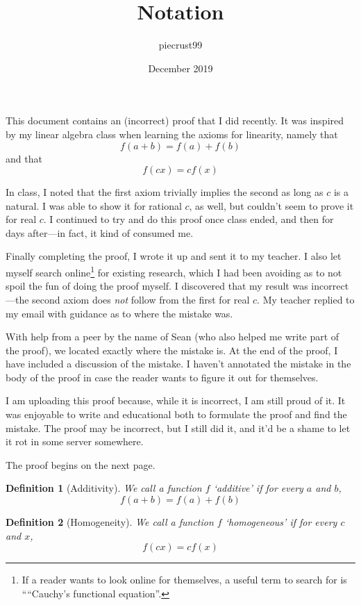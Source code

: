 \documentclass{article}
\title{Notation}
\author{piecrust99 }
\date{December 2019}
\theoremstyle{mytheoremstyle}
\newtheorem{definition}{Definition}
\begin{document}
This document contains an (incorrect) proof that I did recently. It was inspired by my linear algebra class when learning the axioms for linearity, namely that
$$ f(a + b) = f(a) + f(b) $$
and that
$$ f(cx) = cf(x) $$

In class, I noted that the first axiom trivially implies the second as long as $c$ is a natural. I was able to show it for rational $c$, as well, but couldn't seem to prove it for real $c$. I continued to try and do this proof once class ended, and then for days after---in fact, it kind of consumed me.

Finally completing the proof, I wrote it up and sent it to my teacher. I also let myself search online\footnote{If a reader wants to look online for themselves, a useful term to search for is ````Cauchy's functional equation''.} for existing research, which I had been avoiding as to not spoil the fun of doing the proof myself. I discovered that my result was incorrect---the second axiom does \textit{not} follow from the first for real $c$. My teacher replied to my email with guidance as to where the mistake was.

With help from a peer by the name of Sean (who also helped me write part of the proof), we located exactly where the mistake is. At the end of the proof, I have included a discussion of the mistake. I haven't annotated the mistake in the body of the proof in case the reader wants to figure it out for themselves.

I am uploading this proof because, while it is incorrect, I am still proud of it. It was enjoyable to write and educational both to formulate the proof and find the mistake. The proof may be incorrect, but I still did it, and it'd be a shame to let it rot in some server somewhere.

The proof begins on the next page.
\newpage


\begin{definition}[Additivity]
We call a function $f$ `additive' if for every $a$ and $b$,
$$ f(a + b) = f(a) + f(b) $$
\end{definition}


\begin{definition}[Homogeneity]
We call a function $f$ `homogeneous' if for every $c$ and $x$,
$$ f(cx) = cf(x) $$
\end{definition}
\end{document}
